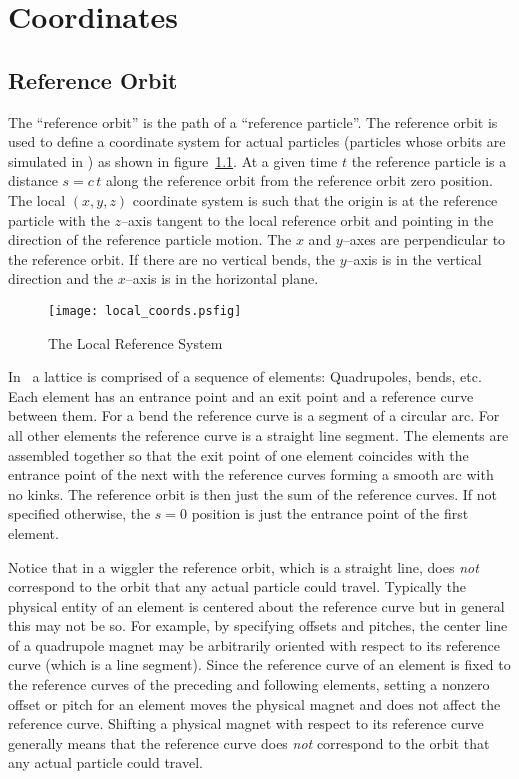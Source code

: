 \chapter{Coordinates}

\section{Reference Orbit}
\label{s:ref}

The ``reference orbit'' is the path of a ``reference particle''.  The
reference orbit is used to define a coordinate system for actual
particles (particles whose orbits are simulated in \bmad) as shown in
figure~\ref{f:local_coords}. At a given time $t$ the reference
particle is a distance $s = c \, t$ along the reference orbit from the
reference orbit zero position. The local $(x, y, z)$ coordinate system
is such that the origin is at the reference particle with the
$z$--axis tangent to the local reference orbit and pointing in the
direction of the reference particle motion. The $x$ and $y$--axes are
perpendicular to the reference orbit. If there are no vertical bends,
the $y$--axis is in the vertical direction and the $x$--axis is in the
horizontal plane.

\begin{figure}[tb]
\centering
\texttt{[image: local\_coords.psfig]}
\caption{The Local Reference System}
\label{f:local_coords}
\end{figure}

In \bmad\ a lattice is comprised of a sequence of elements:
Quadrupoles, bends, etc. Each element has an entrance point and an
exit point and a reference curve between them. For a bend the
reference curve is a segment of a circular arc. For all other elements
the reference curve is a straight line segment. The elements are assembled
together so that the exit point of one element coincides with the
entrance point of the next with the reference curves forming a smooth
arc with no kinks. The reference orbit is then just the sum of the
reference curves. If not specified otherwise, the $s = 0$ position is
just the entrance point of the first element.

Notice that in a wiggler the reference orbit, which is a straight
line, does {\em not} correspond to the orbit that any actual particle
could travel. Typically the physical entity of an element is centered
about the reference curve but in general this may not be so. For
example, by specifying offsets and pitches, the center line of a
quadrupole magnet may be arbitrarily oriented with respect to its
reference curve (which is a line segment). Since the reference curve
of an element is fixed to the reference curves of the preceding and
following elements, setting a nonzero offset or pitch for an element
moves the physical magnet and does not affect the reference
curve. Shifting a physical magnet with respect to its reference curve
generally means that the reference curve does {\em not} correspond to
the orbit that any actual particle could travel.

